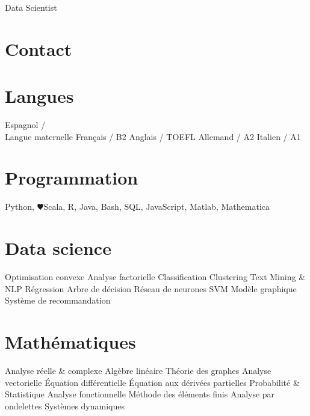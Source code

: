 \documentclass[]{friggeri-cv}
\begin{document}
       {Data Scientist}


\begin{aside}
  \section{Contact} 
  \makecvheader
  \section{Langues}
    Espagnol / \\  Langue maternelle
    Français / B2
    Anglais / TOEFL
    Allemand / A2
    Italien / A1
  \section{Programmation}
    Python, {\color{red}$\varheartsuit$}Scala, 
    R, Java,  
    Bash, SQL, %
    JavaScript, %
    Matlab, Mathematica
 \section{Data science}
   Optimisation convexe
   Analyse factorielle
   Classification
   Clustering
   Text Mining \& NLP
   Régression
   Arbre de décision
   Réseau de neurones
   SVM
   Modèle graphique
   Système de recommandation
   \section{Mathématiques}  
   Analyse réelle \& complexe
   Algèbre linéaire
   Théorie des graphes
   Analyse vectorielle
   Équation différentielle 
   Équation aux dérivées partielles
   Probabilité \& Statistique
   Analyse fonctionnelle
   Méthode des éléments finis
   Analyse par ondelettes
   Systèmes dynamiques
\end{aside}
\end{document}
